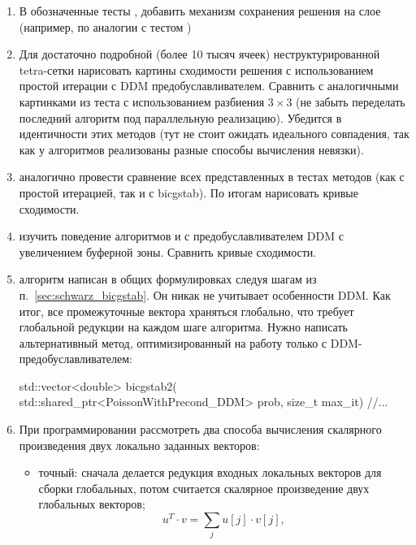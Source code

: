 \label{sec:schwarz2_todo}
\begin{enumerate}
\item В обозначенные тесты ,  добавить механизм сохранения решения на слое (например, по аналогии с тестом )
\item Для достаточно подробной (более 10 тысяч ячеек) неструктурированной tetra-сетки нарисовать картины сходимости решения с использованием простой итерации с DDM предобуславливателем.
      Сравнить с аналогичными картинками из теста  с использованием разбиения $3\times3$ (не забыть переделать последний алгоритм под параллельную реализацию).
      Убедится в идентичности этих методов (тут не стоит ожидать идеального совпадения, так как у алгоритмов реализованы разные способы вычисления невязки).
\item аналогично провести сравнение всех представленных в тестах методов (как с простой итерацией, так и с bicgstab). По итогам нарисовать кривые сходимости.
\item изучить поведение алгоритмов  и  с предобуславливателем DDM с увеличением буферной зоны. Сравнить кривые сходимости.
\item алгоритм  написан в общих формулировках следуя шагам из п.~\ref{sec:schwarz_bicgstab}. Он никак не учитывает особенности DDM.
      Как итог, все промежуточные вектора храняться глобально, что требует глобальной редукции на каждом шаге алгоритма. Нужно написать альтернативный метод, оптимизированный на работу только
      с DDM-предобуславливателем:
\begin{cppcode}
std::vector<double> bicgstab2(
        std::shared_ptr<PoissonWithPrecond_DDM> prob,
        size_t max_it){
    //...
}
\end{cppcode}
\item При программировании  рассмотреть два способа вычисления скалярного произведения двух локально заданных векторов:
      \begin{itemize}
      \item точный: сначала делается редукция  входных локальных векторов для сборки глобальных, потом считается скалярное произведение двух глобальных векторов;
            \begin{equation*}
            u^T \cdot v = \sum_j u[j] \cdot v[j],
            \end{equation*}

\end{itemize}
\end{enumerate}
